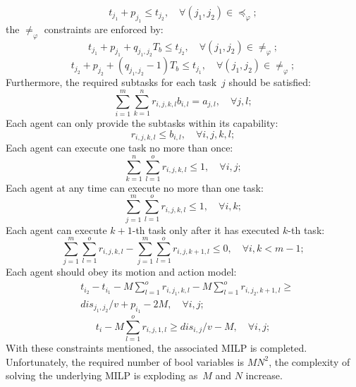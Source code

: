 \begin{equation}
t_{j_1}+p_{j_1}\leq t_{j_2}, \quad  \forall (j_1,j_2)\in \preceq_{\varphi};
\label{1}
\end{equation}
the $\neq_{\varphi}$ constraints are enforced by:
\begin{equation}
t_{j_1}+p_{j_1}+q_{j_1,j_2}T_b\leq t_{j_2}, \quad  \forall (j_1,j_2)\in \neq_{\varphi};
\label{1.5}
\end{equation}
\begin{equation}
t_{j_2}+p_{j_2}+(q_{j_1,j_2}-1)T_b\leq t_{j_1}, \quad  \forall (j_1,j_2)\in \neq_{\varphi};
\label{1.8}
\end{equation}
Furthermore, the required subtasks for each task~$j$ should be satisfied:
\begin{equation}
\sum_{i=1}^{m}\sum_{k=1}^{n}r_{i,j,k,l}b_{i,l}= a_{j,l},   \quad \forall j,l;
\label{2}
\end{equation}
Each agent can only provide the subtasks within its capability:
\begin{equation}
r_{i,j,k,l}\leq b_{i,l},   \quad \forall i,j,k,l;
\label{3}
\end{equation}
Each agent can execute one task no more than once:
\begin{equation}
\sum_{k=1}^{n}\sum_{l=1}^{o}r_{i,j,k,l} \leq 1,\quad   \forall i,j;
\label{4}
\end{equation}
Each agent at any time can execute no more than one task:
\begin{equation}
\sum_{j=1}^{m}\sum_{l=1}^{o}r_{i,j,k,l} \leq 1,\quad    \forall i,k;
\label{5}
\end{equation}
Each agent can execute $k+1$-th task only after it has executed $k$-th task:
\begin{equation}
  \sum_{j=1}^{m}\sum_{l=1}^{o}r_{i,j,k,l} - \sum_{j=1}^{m}\sum_{l=1}^{o}r_{i,j,k+1,l}
  \leq  0,    \quad\forall i,k<m-1;
\label{6}
\end{equation}
Each agent should obey its motion and action model:
\begin{equation}
\begin{aligned}
&t_{i_2}-t_{i_1} -M\sum_{l=1}^o r_{i,j_1,k,l}-M\sum_{l=1}^o r_{i,j_2,k+1,l}  \geq\\
& dis_{j_1,j_2}/v+p_{i_1}-2M, \quad   \forall i,j;
\end{aligned}
\label{7}
\end{equation}
\begin{equation}
t_{i} -M\sum_{l=1}^o r_{i,j,1,l} \geq dis_{i,j}/v-M, \quad  \forall i,j;
\label{8}
\end{equation}
With these constraints mentioned, the associated MILP is completed.
Unfortunately, the required number of bool variables
is $MN^2$, the complexity of solving the underlying MILP
is exploding as~$M$ and $N$ increase.



